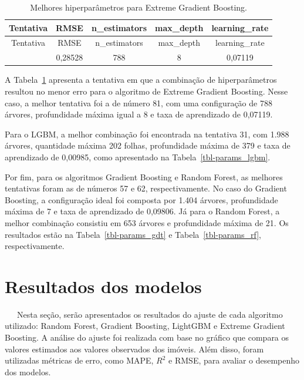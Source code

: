 \documentclass[
  12pt,
  a4paper,
]{scrreprt}
\begin{document}
\begin{longtable}[]{@{}ccccc@{}}
\caption{Melhores hiperparâmetros para Extreme Gradient
Boosting.}\label{tbl-params_xgb}\tabularnewline
\toprule\noalign{}
Tentativa & RMSE & n\_estimators & max\_depth & learning\_rate \\
\midrule\noalign{}
\endfirsthead
\toprule\noalign{}
Tentativa & RMSE & n\_estimators & max\_depth & learning\_rate \\
\midrule\noalign{}
\endhead
\bottomrule\noalign{}
\endlastfoot
81 & 0,28528 & 788 & 8 & 0,07119 \\
\end{longtable}

A Tabela~\ref{tbl-params_xgb} apresenta a tentativa em que a combinação
de hiperparâmetros resultou no menor erro para o algoritmo de Extreme
Gradient Boosting. Nesse caso, a melhor tentativa foi a de número 81,
com uma configuração de 788 árvores, profundidade máxima igual a 8 e
taxa de aprendizado de 0,07119.

\vspace{12pt}

Para o LGBM, a melhor combinação foi encontrada na tentativa 31, com
1.988 árvores, quantidade máxima 202 folhas, profundidade máxima de 379
e taxa de aprendizado de 0,00985, como apresentado na
Tabela~\ref{tbl-params_lgbm}.

\vspace{12pt}

Por fim, para os algoritmos Gradient Boosting e Random Forest, as
melhores tentativas foram as de números 57 e 62, respectivamente. No
caso do Gradient Boosting, a configuração ideal foi composta por 1.404
árvores, profundidade máxima de 7 e taxa de aprendizado de 0,09806. Já
para o Random Forest, a melhor combinação consistiu em 653 árvores e
profundidade máxima de 21. Os resultados estão na
Tabela~\ref{tbl-params_gdt} e Tabela~\ref{tbl-params_rf},
respectivamente.

\section{Resultados dos modelos}\label{resultados-dos-modelos}

~~~Nesta seção, serão apresentados os resultados do ajuste de cada
algoritmo utilizado: Random Forest, Gradient Boosting, LightGBM e
Extreme Gradient Boosting. A análise do ajuste foi realizada com base no
gráfico que compara os valores estimados aos valores observados dos
imóveis. Além disso, foram utilizadas métricas de erro, como MAPE,
\(R^2\) e RMSE, para avaliar o desempenho dos modelos.
\end{document}
